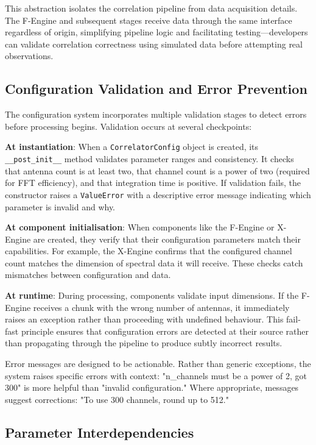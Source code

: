This abstraction isolates the correlation pipeline from data acquisition details. The F-Engine and subsequent stages receive data through the same interface regardless of origin, simplifying pipeline logic and facilitating testing—developers can validate correlation correctness using simulated data before attempting real observations.

\subsection{Configuration Validation and Error Prevention}

The configuration system incorporates multiple validation stages to detect errors before processing begins. Validation occurs at several checkpoints:

\textbf{At instantiation}: When a \texttt{CorrelatorConfig} object is created, its \texttt{\_\_post\_init\_\_} method validates parameter ranges and consistency. It checks that antenna count is at least two, that channel count is a power of two (required for FFT efficiency), and that integration time is positive. If validation fails, the constructor raises a \texttt{ValueError} with a descriptive error message indicating which parameter is invalid and why.

\textbf{At component initialisation}: When components like the F-Engine or X-Engine are created, they verify that their configuration parameters match their capabilities. For example, the X-Engine confirms that the configured channel count matches the dimension of spectral data it will receive. These checks catch mismatches between configuration and data.

\textbf{At runtime}: During processing, components validate input dimensions. If the F-Engine receives a chunk with the wrong number of antennas, it immediately raises an exception rather than proceeding with undefined behaviour. This fail-fast principle ensures that configuration errors are detected at their source rather than propagating through the pipeline to produce subtly incorrect results.

Error messages are designed to be actionable. Rather than generic exceptions, the system raises specific errors with context: "n\_channels must be a power of 2, got 300" is more helpful than "invalid configuration." Where appropriate, messages suggest corrections: "To use 300 channels, round up to 512."

\subsection{Parameter Interdependencies}

